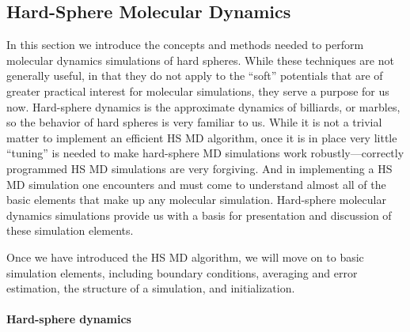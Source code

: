 \documentclass[]{article}
\date{}
\let\oldparagraph\paragraph
\renewcommand{\paragraph}[1]{\oldparagraph{#1}\mbox{}}
\begin{document}
\subsection{Hard-Sphere Molecular
Dynamics}\label{hard-sphere-molecular-dynamics}

In this section we introduce the concepts and methods needed to perform
molecular dynamics simulations of hard spheres. While these techniques
are not generally useful, in that they do not apply to the ``soft''
potentials that are of greater practical interest for molecular simulations, they serve a purpose
for us now. Hard-sphere dynamics is the approximate dynamics of billiards, or
marbles, so the behavior of hard spheres is very familiar to us. While it is not a
trivial matter to implement an efficient HS MD algorithm, once it is in
place very little ``tuning'' is needed to make hard-sphere MD
simulations work robustly---correctly programmed HS MD simulations are
very forgiving. And in implementing a HS MD simulation one
encounters and must come to understand almost all of the basic elements
that make up any molecular simulation. Hard-sphere molecular dynamics
simulations provide us with a basis for presentation and discussion of
these simulation elements.

Once we have introduced the HS MD algorithm, we will move on to basic
simulation elements, including boundary conditions, averaging and error
estimation, the structure of a simulation, and initialization.

\paragraph{Hard-sphere dynamics}\label{hard-sphere-dynamics}
\end{document}
